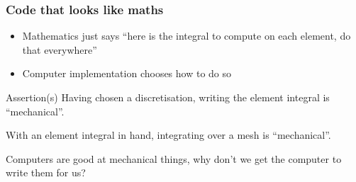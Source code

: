 \documentclass[presentation, 10pt]{beamer}
\begin{document}
\begin{frame}[t]
  \frametitle{Code that looks like maths}
  \begin{itemize}
  \item Mathematics just says ``here is the integral to compute on each
    element, do that everywhere''
  \item Computer implementation chooses how to do so
  \end{itemize}
  \begin{block}{Assertion(s)}
    \vspace{0.25\baselineskip}
    Having chosen a discretisation, writing the element integral is ``mechanical''.

    With an element integral in hand, integrating over a mesh is
    ``mechanical''.
  \end{block}

  \begin{corollary}
    \vspace{0.25\baselineskip}
    Computers are good at mechanical things, why don't we get the
    computer to write them for us?
  \end{corollary}
\end{frame}
\end{document}
